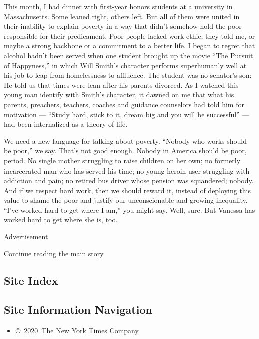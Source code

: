 This month, I had dinner with first-year honors students at a university
in Massachusetts. Some leaned right, others left. But all of them were
united in their inability to explain poverty in a way that didn't
somehow hold the poor responsible for their predicament. Poor people
lacked work ethic, they told me, or maybe a strong backbone or a
commitment to a better life. I began to regret that alcohol hadn't been
served when one student brought up the movie ``The Pursuit of
Happyness,'' in which Will Smith's character performs superhumanly well
at his job to leap from homelessness to affluence. The student was no
senator's son: He told us that times were lean after his parents
divorced. As I watched this young man identify with Smith's character,
it dawned on me that what his parents, preachers, teachers, coaches and
guidance counselors had told him for motivation --- ``Study hard, stick
to it, dream big and you will be successful'' --- had been internalized
as a theory of life.

We need a new language for talking about poverty. ``Nobody who works
should be poor,'' we say. That's not good enough. Nobody in America
should be poor, period. No single mother struggling to raise children on
her own; no formerly incarcerated man who has served his time; no young
heroin user struggling with addiction and pain; no retired bus driver
whose pension was squandered; nobody. And if we respect hard work, then
we should reward it, instead of deploying this value to shame the poor
and justify our unconscionable and growing inequality. ``I've worked
hard to get where I am,'' you might say. Well, sure. But Vanessa has
worked hard to get where she is, too.

Advertisement

\protect\hyperlink{after-bottom}{Continue reading the main story}

\hypertarget{site-index}{%
\subsection{Site Index}\label{site-index}}

\hypertarget{site-information-navigation}{%
\subsection{Site Information
Navigation}\label{site-information-navigation}}

\begin{itemize}
\tightlist
\item
  \href{https://help.nytimes3xbfgragh.onion/hc/en-us/articles/115014792127-Copyright-notice}{©~2020~The
  New York Times Company}
\end{itemize}

